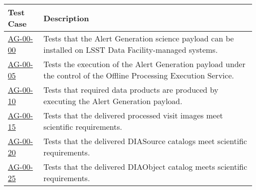 \begin{longtable} {|p{}|p{}|}\hline
\textbf{Test Case}  & \textbf{Description} \\\hline

\hyperref[ag-00-00]{AG-00-00} & Tests that the Alert Generation science payload can be installed on LSST Data Facility-managed systems.\\\hline
\hyperref[ag-00-05]{AG-00-05} & Tests the execution of the Alert Generation
payload under the control of the Offline Processing Execution Service.\\\hline
\hyperref[ag-00-10]{AG-00-10} & Tests that required data products are
produced by executing the Alert Generation payload. \\\hline
\hyperref[ag-00-15]{AG-00-15} & Tests that the delivered processed visit images meet scientific requirements. \\\hline
\hyperref[ag-00-20]{AG-00-20} & Tests that the delivered DIASource catalogs meet scientific requirements. \\\hline
\hyperref[ag-00-25]{AG-00-25} & Tests that the delivered DIAObject
	catalog meets scientific requirements. \\\hline
\end{longtable}
